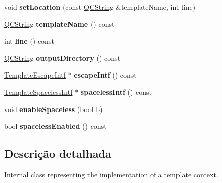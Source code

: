 \begin{DoxyCompactItemize}
\item 
\hypertarget{class_template_context_impl_a0338668464dd3ea6d572d475355ac175}{void {\bfseries set\-Location} (const \hyperlink{class_q_c_string}{Q\-C\-String} \&template\-Name, int line)}\label{class_template_context_impl_a0338668464dd3ea6d572d475355ac175}

\item 
\hypertarget{class_template_context_impl_a252629acf6dbf0a69894af5f525da4a1}{\hyperlink{class_q_c_string}{Q\-C\-String} {\bfseries template\-Name} () const }\label{class_template_context_impl_a252629acf6dbf0a69894af5f525da4a1}

\item 
\hypertarget{class_template_context_impl_aa6e2444d9f9eb15566a2c8cb42e45788}{int {\bfseries line} () const }\label{class_template_context_impl_aa6e2444d9f9eb15566a2c8cb42e45788}

\item 
\hypertarget{class_template_context_impl_adc4bb7e1cb5ddf3d521fbe3fdc98da9a}{\hyperlink{class_q_c_string}{Q\-C\-String} {\bfseries output\-Directory} () const }\label{class_template_context_impl_adc4bb7e1cb5ddf3d521fbe3fdc98da9a}

\item 
\hypertarget{class_template_context_impl_ae54de444d339372b4f6a984a7776e583}{\hyperlink{class_template_escape_intf}{Template\-Escape\-Intf} $\ast$ {\bfseries escape\-Intf} () const }\label{class_template_context_impl_ae54de444d339372b4f6a984a7776e583}

\item 
\hypertarget{class_template_context_impl_a7f781ee5a5f518108ea2143fa4c95d32}{\hyperlink{class_template_spaceless_intf}{Template\-Spaceless\-Intf} $\ast$ {\bfseries spaceless\-Intf} () const }\label{class_template_context_impl_a7f781ee5a5f518108ea2143fa4c95d32}

\item 
\hypertarget{class_template_context_impl_a098d626f9758d09b8e0cc61c9c9e3863}{void {\bfseries enable\-Spaceless} (bool b)}\label{class_template_context_impl_a098d626f9758d09b8e0cc61c9c9e3863}

\item 
\hypertarget{class_template_context_impl_a6d07f0663d72fdd9de1114715751c099}{bool {\bfseries spaceless\-Enabled} () const }\label{class_template_context_impl_a6d07f0663d72fdd9de1114715751c099}

\end{DoxyCompactItemize}


\subsection{Descrição detalhada}
Internal class representing the implementation of a template context. 

